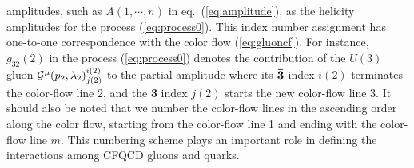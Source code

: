 amplitudes, such as $A(1,\cdots,n)$ in eq.~(\ref{eq:amplitude}), as the
helicity amplitudes for the process (\ref{eq:process0}). This index number assignment has one-to-one correspondence
with the color flow (\ref{eq:gluoncf}). For instance, $g_{32}(2)$
in the process (\ref{eq:process0}) denotes the contribution of the $U(3)$ gluon
${\cal G}^{\mu}(p_2,\lambda _2)_{j(2)}^{i(2)}$ to the partial amplitude where its
${\bf \bar{3}}$ index $i(2)$ terminates the color-flow line 2, and the
{\bf 3} index $j(2)$ starts the new color-flow line 3. It should also be noted
that we number the color-flow lines in the ascending order along the
color flow, starting from the color-flow line 1 and ending with the
color-flow line $m$. This numbering scheme plays an important role in defining
the interactions among CFQCD gluons and quarks.

